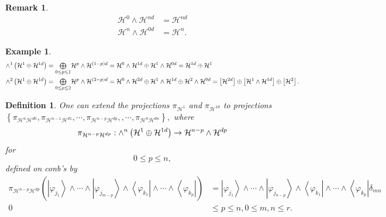\documentclass[aps,preprint]{revtex4}%
\newtheorem{definition}[theorem]{Definition}
\newtheorem{example}[theorem]{Example}
\newtheorem{remark}[theorem]{Remark}
\begin{document}
\begin{remark}%
\begin{align}
\mathcal{H}^{0}\wedge\mathcal{H}^{nd}  &  =\mathcal{H}^{nd}\\
\mathcal{H}^{n}\wedge\mathcal{H}^{0d}  &  =\mathcal{H}^{n}.
\end{align}

\end{remark}

\begin{example}%
\begin{align}
{\huge \wedge}^{1}\left(  \mathcal{H}^{1}\oplus\mathcal{H}^{1d}\right)   &  =%
{\textstyle\bigoplus\limits_{0\leq p\leq1}}
\mathcal{H}^{p}\wedge\mathcal{H}^{\left(  1-p\right)  d}=\mathcal{H}^{0}%
\wedge\mathcal{H}^{1d}\oplus\mathcal{H}^{1}\wedge\mathcal{H}^{0d}%
=\mathcal{H}^{1d}\oplus\mathcal{H}^{1}\\
{\huge \wedge}^{2}\left(  \mathcal{H}^{1}\oplus\mathcal{H}^{1d}\right)   &  =%
{\textstyle\bigoplus\limits_{0\leq p\leq2}}
\mathcal{H}^{p}\wedge\mathcal{H}^{\left(  2-p\right)  d}=\mathcal{H}^{0}%
\wedge\mathcal{H}^{2d}\oplus\mathcal{H}^{1}\wedge\mathcal{H}^{1d}%
\oplus\mathcal{H}^{2}\wedge\mathcal{H}^{0d}=\left[  \mathcal{H}^{2d}\right]
\oplus\left[  \mathcal{H}^{1}\wedge\mathcal{H}^{1d}\right]  \oplus\left[
\mathcal{H}^{2}\right]  .
\end{align}

\end{example}

\begin{definition}
One can extend the projections $\pi_{\mathcal{H}^{1}}$ and $\pi_{\mathcal{H}%
^{1d}}$ to projections $\left\{  \pi_{\mathcal{H}^{n}\mathcal{H}^{d0}}%
,\pi_{\mathcal{H}^{n-1}\mathcal{H}^{d1}},\cdots,\pi_{\mathcal{H}%
^{n-p}\mathcal{H}^{dp}},,\cdots,\pi_{\mathcal{H}^{0}\mathcal{H}^{dn}}\right\}
,$ where
\begin{equation}
\pi_{\mathcal{H}^{n-p}\mathcal{H}^{dp}}:{\huge \wedge}^{n}\left(
\mathcal{H}^{1}\oplus\mathcal{H}^{1d}\right)  \rightarrow\mathcal{H}%
^{n-p}\wedge\mathcal{H}^{dp}%
\end{equation}
for
\begin{equation}
0\leq p\leq n,
\end{equation}
defined on conb's by
\begin{align}
\pi_{\mathcal{H}^{n-p}\mathcal{H}^{dp}}\left(  \left\vert \varphi_{j_{1}%
}\right\rangle \wedge\cdots\wedge\left\vert \varphi_{j_{m-p}}\right\rangle
\wedge\left\langle \varphi_{k_{1}}\right\vert \wedge\cdots\wedge\left\langle
\varphi_{k_{p}}\right\vert \right)   &  =\left\vert \varphi_{j_{1}%
}\right\rangle \wedge\cdots\wedge\left\vert \varphi_{j_{n-p}}\right\rangle
\wedge\left\langle \varphi_{k_{1}}\right\vert \wedge\cdots\wedge\left\langle
\varphi_{k_{p}}\right\vert \delta_{mn}\\
0  &  \leq p\leq n,0\leq m,n\leq r.
\end{align}

\end{definition}
\end{document}
